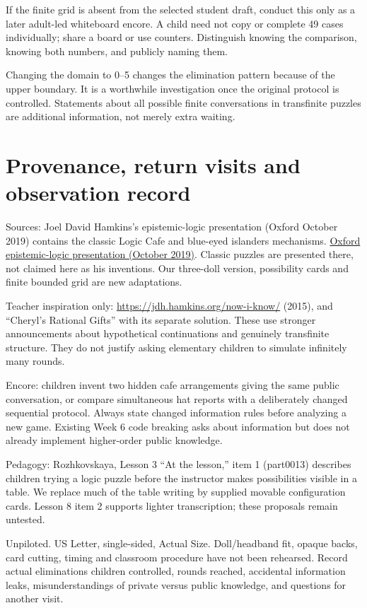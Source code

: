 \documentclass[11pt,letterpaper]{article}
\begin{document}
If the finite grid is absent from the selected student draft, conduct this only as a later adult-led whiteboard encore. A child need not copy or complete 49 cases individually; share a board or use counters. Distinguish knowing the comparison, knowing both numbers, and publicly naming them.

Changing the domain to 0--5 changes the elimination pattern because of the upper boundary. It is a worthwhile investigation once the original protocol is controlled. Statements about all possible finite conversations in transfinite puzzles are additional information, not merely extra waiting.
\newpage
\section*{Provenance, return visits and observation record}
Sources: Joel David Hamkins's epistemic-logic presentation (Oxford October 2019) contains the classic Logic Cafe and blue-eyed islanders mechanisms. \href{https://jdh.hamkins.org/i-know-that-you-know-that-i-know-that-you-know-oxford-october-2019/}{Oxford epistemic-logic presentation (October 2019)}. Classic puzzles are presented there, not claimed here as his inventions. Our three-doll version, possibility cards and finite bounded grid are new adaptations.

Teacher inspiration only: \url{https://jdh.hamkins.org/now-i-know/} (2015), and ``Cheryl's Rational Gifts'' with its separate solution. These use stronger announcements about hypothetical continuations and genuinely transfinite structure. They do not justify asking elementary children to simulate infinitely many rounds.

Encore: children invent two hidden cafe arrangements giving the same public conversation, or compare simultaneous hat reports with a deliberately changed sequential protocol. Always state changed information rules before analyzing a new game. Existing Week 6 code breaking asks about information but does not already implement higher-order public knowledge.

Pedagogy: Rozhkovskaya, Lesson 3 ``At the lesson,'' item 1 (part0013) describes children trying a logic puzzle before the instructor makes possibilities visible in a table. We replace much of the table writing by supplied movable configuration cards. Lesson 8 item 2 supports lighter transcription; these proposals remain untested.

Unpiloted. US Letter, single-sided, Actual Size. Doll/headband fit, opaque backs, card cutting, timing and classroom procedure have not been rehearsed. Record actual eliminations children controlled, rounds reached, accidental information leaks, misunderstandings of private versus public knowledge, and questions for another visit.
\end{document}

